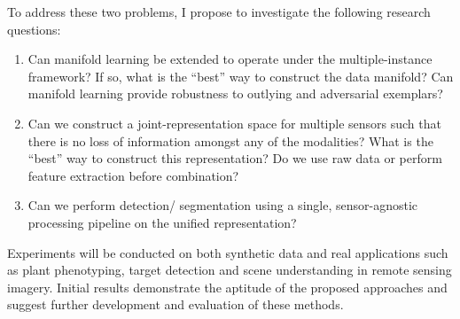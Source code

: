\newline
To address these two problems, I propose to investigate the following research questions:
\begin{enumerate}
	\item Can manifold learning be extended to operate under the multiple-instance framework? If so, what is the ``best'' way to construct the data manifold?  Can manifold learning provide robustness to outlying and adversarial exemplars?
	\item Can we construct a joint-representation space for multiple sensors such that there is no loss of information amongst any of the modalities?  What is the ``best'' way to construct this representation?  Do we use raw data or perform feature extraction before combination?
	\item Can we perform detection/ segmentation using a single, sensor-agnostic processing pipeline on the unified representation?
\end{enumerate} 

Experiments will be conducted on both synthetic data and real applications such as plant phenotyping, target detection and scene understanding in remote sensing imagery. Initial results demonstrate the aptitude of the proposed approaches and suggest further development and evaluation of these methods.
